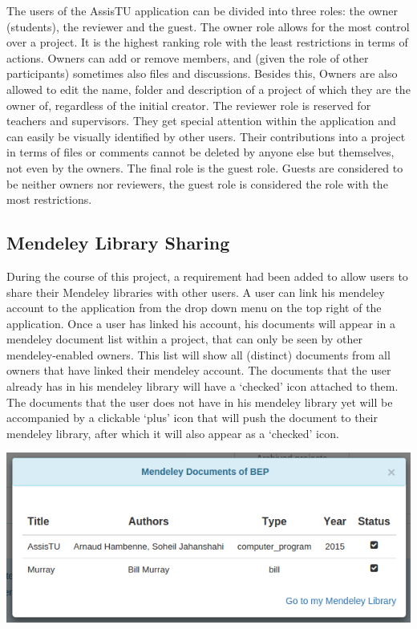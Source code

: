 The users of the AssisTU application can be divided into three roles: the owner (students), the reviewer and the guest. The owner role allows for the 
most control over a project. It is the highest ranking role with the least restrictions in terms of actions.
Owners can add or remove members, and (given the role of other participants) sometimes also files and discussions. Besides this, Owners are also 
allowed to edit the name, folder and description of a project of which they are the owner of, regardless of the initial creator. 
The reviewer role is reserved for teachers and supervisors. They get special attention within the application and can easily be visually identified by 
other users. Their contributions into a project in terms of files or comments cannot be deleted by anyone else but themselves, not even by the owners. 
The final role is the guest role. Guests are considered to be neither owners nor reviewers, the guest role is considered the role with the most 
restrictions.

\newpage

\subsection{Mendeley Library Sharing}

During the course of this project, a requirement had been added to allow users to share their Mendeley libraries with other users. A user can
link his mendeley account to the application from the drop down menu on the top right of the application. Once a user has linked his account,
his documents will appear in a mendeley document list within a project, that can only be seen by other mendeley-enabled owners. This list will show
all (distinct) documents from all owners that have linked their mendeley account. The documents that the user already has in his mendeley library
will have a `checked' icon attached to them. The documents that the user does not have in his mendeley library yet will be accompanied by a clickable 
`plus' icon that will push the document to their mendeley library, after which it will also appear as a `checked' icon.

\begin{center}
\includegraphics[scale=0.5]{./img/mendeley.png}
\end{center}

